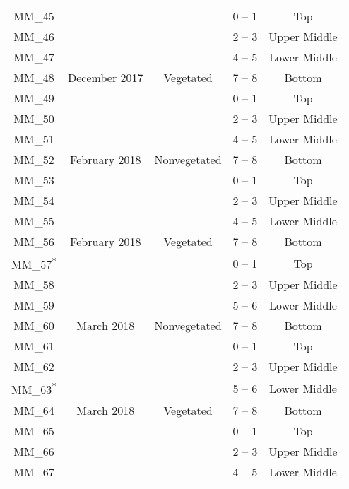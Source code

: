 \documentclass[
  12 pt,
]{article}
\begin{document}
\begin{singlespace}
\begin{longtable}[t]{ccccc}
MM\_45 &  &  & 0 – 1 & Top\\
\nopagebreak
MM\_46 &  &  & 2 – 3 & Upper Middle\\
\nopagebreak
MM\_47 &  &  & 4 – 5 & Lower Middle\\
\nopagebreak
MM\_48 & \multirow{-4}{*}{\centering\arraybackslash 13 December 2017} & \multirow{-4}{*}{\centering\arraybackslash Vegetated} & 7 – 8 & Bottom\\
\cmidrule{1-5}\pagebreak[0]
MM\_49 &  &  & 0 – 1 & Top\\
\nopagebreak
MM\_50 &  &  & 2 – 3 & Upper Middle\\
\nopagebreak
MM\_51 &  &  & 4 – 5 & Lower Middle\\
\nopagebreak
MM\_52 & \multirow{-4}{*}{\centering\arraybackslash 12 February 2018} & \multirow{-4}{*}{\centering\arraybackslash Nonvegetated} & 7 – 8 & Bottom\\
\cmidrule{1-5}\pagebreak[0]
MM\_53 &  &  & 0 – 1 & Top\\
\nopagebreak
MM\_54 &  &  & 2 – 3 & Upper Middle\\
\nopagebreak
MM\_55 &  &  & 4 – 5 & Lower Middle\\
\nopagebreak
MM\_56 & \multirow{-4}{*}{\centering\arraybackslash 12 February 2018} & \multirow{-4}{*}{\centering\arraybackslash Vegetated} & 7 – 8 & Bottom\\
\cmidrule{1-5}\pagebreak[0]
MM\_57\textsuperscript{*} &  &  & 0 – 1 & Top\\
\nopagebreak
MM\_58 &  &  & 2 – 3 & Upper Middle\\
\nopagebreak
MM\_59 &  &  & 5 – 6 & Lower Middle\\
\nopagebreak
MM\_60 & \multirow{-4}{*}{\centering\arraybackslash 26 March 2018} & \multirow{-4}{*}{\centering\arraybackslash Nonvegetated} & 7 – 8 & Bottom\\
\cmidrule{1-5}\pagebreak[0]
MM\_61 &  &  & 0 – 1 & Top\\
\nopagebreak
MM\_62 &  &  & 2 – 3 & Upper Middle\\
\nopagebreak
MM\_63\textsuperscript{*} &  &  & 5 – 6 & Lower Middle\\
\nopagebreak
MM\_64 & \multirow{-4}{*}{\centering\arraybackslash 26 March 2018} & \multirow{-4}{*}{\centering\arraybackslash Vegetated} & 7 – 8 & Bottom\\
\cmidrule{1-5}\pagebreak[0]
MM\_65 &  &  & 0 – 1 & Top\\
\nopagebreak
MM\_66 &  &  & 2 – 3 & Upper Middle\\
\nopagebreak
MM\_67 &  &  & 4 – 5 & Lower Middle\\

\end{longtable}
\end{singlespace}
\end{document}
